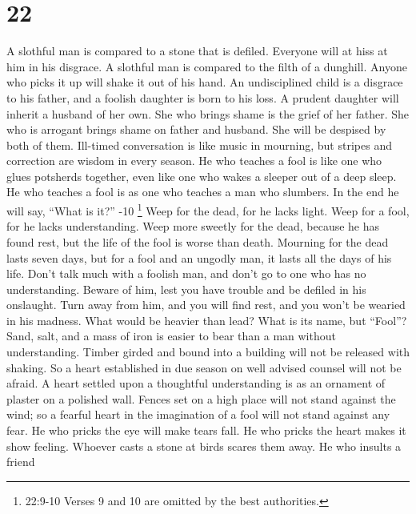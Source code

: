 \hypertarget{section-18}{%
\section{22}\label{section-18}}

 A slothful man is compared to a stone that is defiled.
Everyone will at hiss at him in his disgrace.  A slothful
man is compared to the filth of a dunghill. Anyone who picks it up will
shake it out of his hand.  An undisciplined child is a
disgrace to his father, and a foolish daughter is born to his loss.
 A prudent daughter will inherit a husband of her own. She
who brings shame is the grief of her father.  She who is
arrogant brings shame on father and husband. She will be despised by
both of them.  Ill-timed conversation is like music in
mourning, but stripes and correction are wisdom in every season.
 He who teaches a fool is like one who glues potsherds
together, even like one who wakes a sleeper out of a deep sleep.
 He who teaches a fool is as one who teaches a man who
slumbers. In the end he will say, ``What is it?'' -10
\footnote{22:9-10 Verses 9 and 10 are omitted by the best authorities.}
 Weep for the dead, for he lacks light. Weep for a fool,
for he lacks understanding. Weep more sweetly for the dead, because he
has found rest, but the life of the fool is worse than death.
 Mourning for the dead lasts seven days, but for a fool and
an ungodly man, it lasts all the days of his life.  Don't
talk much with a foolish man, and don't go to one who has no
understanding. Beware of him, lest you have trouble and be defiled in
his onslaught. Turn away from him, and you will find rest, and you won't
be wearied in his madness.  What would be heavier than
lead? What is its name, but ``Fool''?  Sand, salt, and a
mass of iron is easier to bear than a man without understanding.
 Timber girded and bound into a building will not be
released with shaking. So a heart established in due season on well
advised counsel will not be afraid.  A heart settled upon a
thoughtful understanding is as an ornament of plaster on a polished
wall.  Fences set on a high place will not stand against
the wind; so a fearful heart in the imagination of a fool will not stand
against any fear.  He who pricks the eye will make tears
fall. He who pricks the heart makes it show feeling. 
Whoever casts a stone at birds scares them away. He who insults a friend
